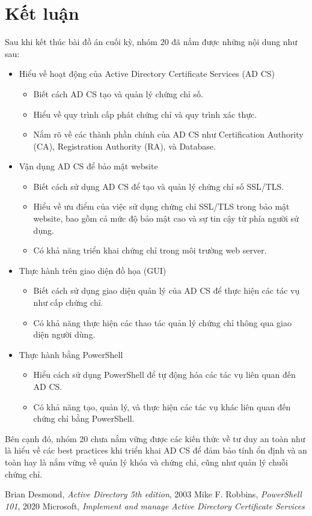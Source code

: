 \documentclass[13pt]{report}
\begin{document}
	\chapter{Kết luận}
	Sau khi kết thúc bài đồ án cuối kỳ, nhóm 20 đã nắm được những nội dung như sau:
	\begin{itemize}
		\item Hiểu về hoạt động của Active Directory Certificate Services (AD CS)
		\begin{itemize}
			\item Biết cách AD CS tạo và quản lý chứng chỉ số.
			\item Hiểu về quy trình cấp phát chứng chỉ và quy trình xác thực.
			\item Nắm rõ về các thành phần chính của AD CS như Certification Authority (CA), Registration Authority (RA), và Database.
		\end{itemize}
		\item Vận dụng AD CS để bảo mật website
		\begin{itemize}
			\item Biết cách sử dụng AD CS để tạo và quản lý chứng chỉ số SSL/TLS.
			\item Hiểu về ưu điểm của việc sử dụng chứng chỉ SSL/TLS trong bảo mật website, bao gồm cả mức độ bảo mật cao và sự tin cậy từ phía người sử dụng.
			\item Có khả năng triển khai chứng chỉ trong môi trường web server.
		\end{itemize}
		\item Thực hành trên giao diện đồ họa (GUI)
		\begin{itemize}
			\item Biết cách sử dụng giao diện quản lý của AD CS để thực hiện các tác vụ như cấp chứng chỉ.
			\item Có khả năng thực hiện các thao tác quản lý chứng chỉ thông qua giao diện người dùng.
		\end{itemize}
		\item Thực hành bằng PowerShell
		\begin{itemize}
			\item Hiểu cách sử dụng PowerShell để tự động hóa các tác vụ liên quan đến AD CS.
			\item Có khả năng tạo, quản lý, và thực hiện các tác vụ khác liên quan đến chứng chỉ bằng PowerShell.
		\end{itemize}
	\end{itemize}
	Bên cạnh đó, nhóm 20 chưa nắm vững được các kiến thức về tư duy an toàn như là hiểu về các best practices khi triển khai AD CS để đảm bảo tính ổn định và an toàn hay là nắm vững về quản lý khóa và chứng chỉ, cũng như quản lý chuỗi chứng chỉ.
	\begin{thebibliography}{99}
		\bibitem{}Brian Desmond, \textit{Active Directory 5th edition}, 2003
		\bibitem{}Mike F. Robbins, \textit{PowerShell 101}, 2020
		\bibitem{}Microsoft, \textit{Implement and manage Active Directory Certificate Services}
	\end{thebibliography}
\end{document}

